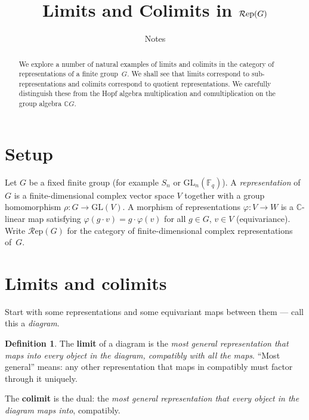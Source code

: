 \documentclass[12pt,a4paper]{article}
\title{Limits and Colimits in $\Rep(G)$}
\author{Notes}
\date{}
\theoremstyle{definition}
\newtheorem{definition}[theorem]{Definition}
\theoremstyle{remark}
\newcommand{\C}{\mathbb{C}}
\newcommand{\F}{\mathbb{F}}
\newcommand{\Rep}{\mathcal{R}\mathrm{ep}}
\newcommand{\GL}{\mathrm{GL}}
\begin{document}
\maketitle

\begin{abstract}
We explore a number of natural examples of limits and colimits in the category
of representations of a finite group~$G$. We shall see that limits correspond to
sub-representations and colimits correspond to quotient representations. We
carefully distinguish these from the Hopf algebra multiplication and
comultiplication on the group algebra $\C G$.
\end{abstract}

\tableofcontents

\section{Setup}

Let $G$ be a fixed finite group (for example $S_n$ or $\GL_n(\F_q)$).
A \emph{representation} of $G$ is a finite-dimensional complex vector space $V$
together with a group homomorphism $\rho\colon G \to \GL(V)$. A morphism of representations $\varphi\colon V \to W$
is a $\C$-linear map satisfying $\varphi(g \cdot v) = g \cdot \varphi(v)$ for all
$g \in G$, $v \in V$ (equivariance).
Write $\Rep(G)$ for the category of finite-dimensional complex representations of~$G$.

\section{Limits and colimits}

Start with some representations and some equivariant maps between them ---
call this a \emph{diagram}.

\begin{definition}
The \textbf{limit} of a diagram is the \emph{most general representation that maps
into every object in the diagram, compatibly with all the maps}. ``Most general''
means: any other representation that maps in compatibly must factor through it uniquely.

The \textbf{colimit} is the dual: the \emph{most general representation that every
object in the diagram maps into}, compatibly.
\end{definition}
\end{document}
